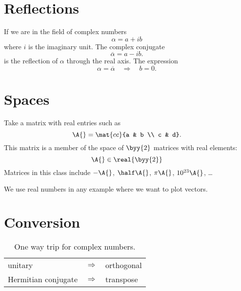 \section{Reflections}
If we are in the field of complex numbers
\begin{equation}
  \alpha = a + i b
\end{equation}
where $i$ is the imaginary unit. The complex conjugate
\begin{equation}
  \overline{\alpha} = a - i b.
\end{equation}
is the reflection of $\alpha$ through the real axis. The expression
\begin{equation}
  \alpha = \overline{\alpha} \quad \Rightarrow \quad b = 0. 
\end{equation}

\section{Spaces}
Take a matrix with real entries such as
\begin{equation}
  \A{} = \mat{cc}{a & b \\ c & d}.
\end{equation}
This matrix is a member of the space of $\byy{2}$ matrices with real elements:
\begin{equation}
  \A{} \in \real{\byy{2}}
\end{equation}
Matrices in this class include $-\A{}$, $\half \A{}$, $\pi \A{}$, $10^{23}\A{}$, \dots

We use real numbers in any example where we want to plot vectors.

\section{Conversion}
\begin{table}[htdp]
\caption[One way trip for complex numbers]{One way trip for complex numbers.}
\begin{center}
\begin{tabular}{lcl}
%
  unitary & $\Longrightarrow$ & orthogonal \\
  Hermitian conjugate  & $\Longrightarrow$ & transpose
%
\end{tabular}
\end{center}
\label{tab:conversion}
\end{table}

